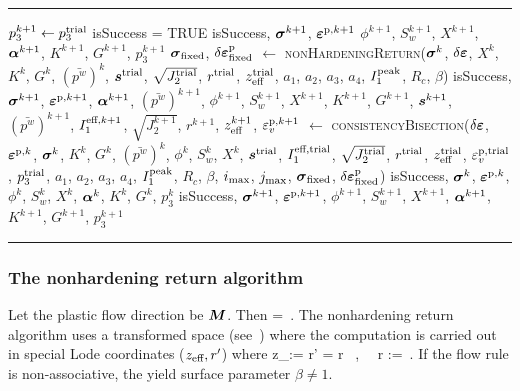 \documentclass[11pt,a4paper]{article}
\makeatletter
\newenvironment{breakablealgorithm}
  {%
   \begin{center}
     \refstepcounter{algorithm}%
     \vspace{10pt}
     \hrule height.8pt depth0pt \kern2pt%
     \renewcommand{\caption}[2][\relax]{%
       {\raggedright\textbf{\ALG@name~\thealgorithm} ##2\par}%
       \ifx\relax##1\relax %
         \addcontentsline{loa}{algorithm}{\protect\numberline{\thealgorithm}##2}%
       \else %
         \addcontentsline{loa}{algorithm}{\protect\numberline{\thealgorithm}##1}%
       \fi
       \kern2pt\hrule\kern2pt
     }
  }{%
     \kern2pt\hrule\relax%
   \end{center}
  }
\makeatother
\begin{document}
\begin{breakablealgorithm}
\begin{algorithmic}[1]
               $p_3^{k+1} \leftarrow p_3^{\text{trial}}$ \WRP
        \State isSuccess = TRUE
        \State \Return isSuccess, $\boldsymbol{\sigma}^{k+1}$, $\boldsymbol{\varepsilon}^{\text{p},{k+1}}$ $\phi^{k+1}$, $S_w^{k+1}$, $X^{k+1}$,
               $\boldsymbol{\alpha}^{k+1}$, $K^{k+1}$, $G^{k+1}$, $p_3^{k+1}$
      \EndIf
      \State $\boldsymbol{\sigma}_{\text{fixed}}$, $\delta\boldsymbol{\varepsilon}^{\text{p}}_{\text{fixed}}$ $\leftarrow$
        \textsc{nonHardeningReturn}($\boldsymbol{\sigma}^k$, $\delta\boldsymbol{\varepsilon}$, $X^k$, $K^k$, $G^k$, $(\bar{p^w})^k$, \WRP
           $\boldsymbol{s}^{\text{trial}}$, $\sqrt{J_2^{\text{trial}}}$, $r^{\text{trial}}$, $z_{\text{eff}}^{\text{trial}}$, 
           $a_1$, $a_2$, $a_3$, $a_4$, $I_1^{\text{peak}}$, $R_c$, $\beta$) \WRP 
      \State isSuccess, $\boldsymbol{\sigma}^{k+1}$, $\boldsymbol{\varepsilon}^{\text{p},{k+1}}$, $\boldsymbol{\alpha}^{k+1}$,
        $(\bar{p^w})^{k+1}$, $\phi^{k+1}$, $S_w^{k+1}$, $X^{k+1}$, $K^{k+1}$, $G^{k+1}$, 
        $\boldsymbol{s}^{k+1}$, $(\bar{p^w})^{k+1}$, $I_1^{\text{eff},{k+1}}$, $\sqrt{J_2^{k+1}}$, \WRP
        $r^{k+1}$, $z_{\text{eff}}^{k+1}$, $\varepsilon_v^{\text{p},{k+1}}$
        $\leftarrow$ \textsc{consistencyBisection}($\delta\boldsymbol{\varepsilon}$, $\boldsymbol{\varepsilon}^{\text{p},k}$, 
           $\boldsymbol{\sigma}^k$, $K^k$, $G^k$, $(\bar{p^w})^k$, $\phi^k$, $S_w^k$, $X^k$, \WRP
           $\boldsymbol{s}^{\text{trial}}$, $I_1^{\text{eff},\text{trial}}$, $\sqrt{J_2^{\text{trial}}}$, 
           $r^{\text{trial}}$, $z_{\text{eff}}^{\text{trial}}$, $\varepsilon_v^{\text{p},\text{trial}}$,
           $p_3^{\text{trial}}$, $a_1$, $a_2$, $a_3$, $a_4$, $I_1^{\text{peak}}$, 
           $R_c$, $\beta$, $i_{\text{max}}$, $j_{\text{max}}$, \WRP
           $\boldsymbol{\sigma}_{\text{fixed}}$, $\delta\boldsymbol{\varepsilon}^{\text{p}}_{\text{fixed}}$)
        \State \Return isSuccess, $\boldsymbol{\sigma}^k$, $\boldsymbol{\varepsilon}^{\text{p},k}$, $\phi^k$, $S_w^k$, $X^k$, 
          $\boldsymbol{\alpha}^k$, $K^k$, $G^k$, $p_3^k$
      \EndIf
      \State \Return isSuccess, $\boldsymbol{\sigma}^{k+1}$, $\boldsymbol{\varepsilon}^{\text{p},{k+1}}$, $\phi^{k+1}$, $S_w^{k+1}$, $X^{k+1}$, 
          $\boldsymbol{\alpha}^{k+1}$, $K^{k+1}$, $G^{k+1}$, $p_3^{k+1}$
    \EndProcedure
  \end{algorithmic}
\end{breakablealgorithm}

\subsubsection{The nonhardening return algorithm}
\label{sec:nonhardening_return}
Let the plastic flow direction be $\boldsymbol{M}$.  Then
\Beq
   = \dot{\lambda}\BM \,.
\Eeq
The nonhardening return algorithm uses a transformed space (see~\citet{Homel2015}) where the computation 
is carried out in special Lode coordinates ($z_{\text{eff}}, r'$) where
\BBeq
  z_\Teff :=   \quad \Tand \quad
  r' = \beta r  ~,~~ r :=  \,.
\BEeq
If the flow rule is non-associative, the yield surface parameter $\beta \ne 1$. 
\end{document}
